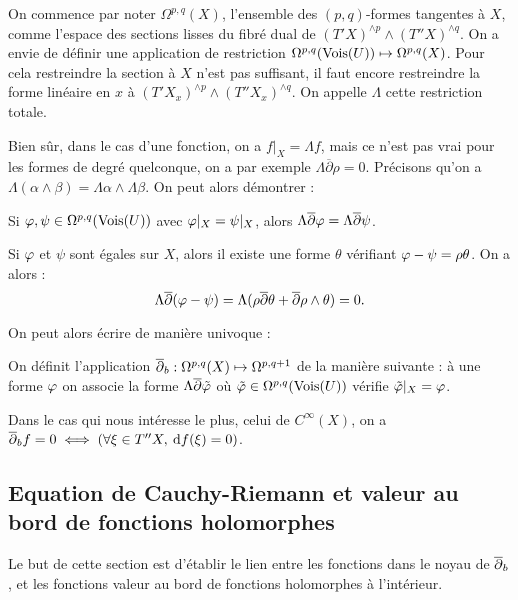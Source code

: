 On commence par noter $\Omega^{p,q}(X)$, l'ensemble des $(p,q)$-formes tangentes à $X$, comme l'espace des sections lisses du fibré dual de $(T'X)^{\wedge p} \wedge (T''X)^{\wedge q}$. On a envie de définir une application de restriction $\Omega^{p,q}(\operatorname{Vois} (U)) \mapsto \Omega^{p,q}(X)$. Pour cela restreindre la section à $X$ n'est pas suffisant, il faut encore restreindre la forme linéaire en $x$ à $(T'X_x)^{\wedge p} \wedge (T''X_x)^{\wedge q}$. On appelle $\Lambda$ cette restriction totale. 

Bien sûr, dans le cas d'une fonction, on a $f|_X = \Lambda f$, mais ce n'est pas vrai pour les formes de degré quelconque, on a par exemple $\Lambda \overline{\partial}\rho =0$. Précisons qu'on a $\Lambda(\alpha \wedge \beta) = \Lambda \alpha \wedge \Lambda \beta$. On peut alors démontrer :

\begin{lem}
	Si $\varphi,\psi \in \Omega^{p,q}(\operatorname{Vois} (U))$ avec $\varphi|_X=\psi|_X$, alors $\Lambda \overline{\partial}\varphi = \Lambda \overline{\partial}\psi$.
\end{lem}
\begin{preuve}
	Si $\varphi$ et $\psi$ sont égales sur $X$, alors il existe une forme $\theta$ vérifiant $\varphi-\psi = \rho\theta$. On a alors :
	\begin{equation*}
		\Lambda \overline{\partial}(\varphi-\psi) = \Lambda(\rho \overline{\partial}\theta + \overline{\partial}\rho \wedge \theta) = 0.
	\end{equation*}
\end{preuve}

On peut alors écrire de manière univoque :
\begin{defn}
	On définit l'application $\overline{\partial}_b : \Omega^{p,q}(X)\mapsto \Omega^{p,q+1}$ de la manière suivante : à une forme $\varphi$ on associe la forme $\Lambda \overline{\partial}\tilde{\varphi}$ où $\tilde{\varphi} \in \Omega^{p,q}(\operatorname{Vois}(U))$ vérifie $\tilde{\varphi}|_X=\varphi$.
\end{defn}
\begin{rem}
	Dans le cas qui nous intéresse le plus, celui de $C^{\infty}(X)$, on a $\overline{\partial}_b f = 0 \iff (\forall \xi \in T''X,\:\mathrm{d} f(\xi)=0)$.
\end{rem}

\subsection{Equation de Cauchy-Riemann et valeur au bord de fonctions holomorphes}
Le but de cette section est d'établir le lien entre les fonctions dans le noyau de $\overline{\partial}_b$, et les fonctions valeur au bord de fonctions holomorphes à l'intérieur.

